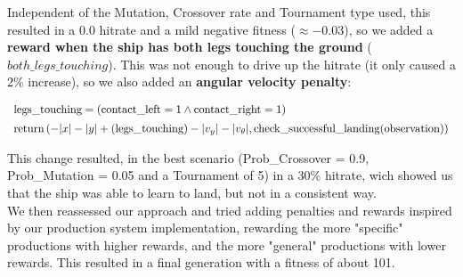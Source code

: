 \documentclass[a4paper, 12pt, fleqn]{report}
\begin{document}
\noindent
Independent of the Mutation, Crossover rate and Tournament type used, this resulted in a 0.0 hitrate and a mild negative fitness ($\approx -0.03$), so we added a \textbf{reward when the ship has both legs touching the ground} ($both\_legs\_touching$). This was not enough to drive up the hitrate (it only caused a 2\% increase), so we also added an \textbf{angular velocity penalty}:

{\scriptsize
\begin{equation}
    \centering
    \begin{array}{l}
        \text{legs\_touching} = (\text{contact\_left} = 1 \land \text{contact\_right} = 1) \\[0.5em]
        \text{return} \left( 
            - |x| 
            - |y| 
            + (\text{legs\_touching}) 
            - |v_y| 
            - |v_\theta|, 
            \text{check\_successful\_landing}(\text{observation})
        \right)
    \end{array}
\end{equation}
}


\noindent
This change resulted, in the best scenario (Prob\_Crossover = 0.9, Prob\_Mutation = 0.05 and a Tournament of 5) in a 30\% hitrate, wich showed us that the ship was able to learn to land, but not in a consistent way.\\
We then reassessed our approach and tried adding penalties and rewards inspired by our production system implementation, rewarding the more "specific" productions with higher rewards, and the more "general" productions with lower rewards. This resulted in a final generation with a fitness of about 101. 
\end{document}
